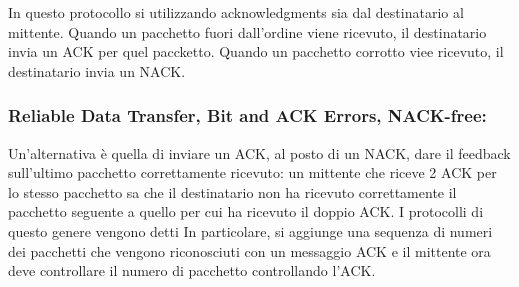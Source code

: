 \documentclass{book}
\newcommand{\tmtextbf}[1]{\text{{\bfseries{#1}}}}
\newcommand{\tmtextit}[1]{\text{{\itshape{#1}}}}
\begin{document}
In questo protocollo si utilizzando acknowledgments sia dal destinatario al
mittente. Quando un pacchetto fuori dall'ordine viene ricevuto, il
destinatario invia un ACK per quel paccketto. Quando un pacchetto corrotto
viee ricevuto, il destinatario invia un NACK.

\subsubsection{Reliable Data Transfer, Bit and ACK Errors, NACK-free:
\tmtextit{rdt2.2}}

Un'alternativa {\`e} quella di inviare un ACK, al posto di un NACK, dare il
feedback sull'ultimo pacchetto correttamente ricevuto: un mittente che riceve
2 ACK per lo stesso pacchetto sa che il destinatario non ha ricevuto
correttamente il pacchetto seguente a quello per cui ha ricevuto il doppio
ACK. I protocolli di questo genere vengono detti \tmtextbf{\tmtextit{rdt2.2}.}
In particolare, si aggiunge una sequenza di numeri dei pacchetti che vengono
riconosciuti con un messaggio ACK e il mittente ora deve controllare il numero
di pacchetto controllando l'ACK.
{}
{}
\end{document}

